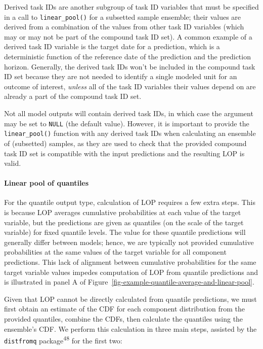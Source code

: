 \documentclass[
]{article}
\let\oldparagraph\paragraph
\renewcommand{\paragraph}[1]{\oldparagraph{#1}\mbox{}}
\begin{document}
Derived task IDs are another subgroup of task ID variables that must be
specified in a call to \texttt{linear\_pool()} for a subsetted sample
ensemble; their values are derived from a combination of the values from
other task ID variables (which may or may not be part of the compound
task ID set). A common example of a derived task ID variable is the
target date for a prediction, which is a deterministic function of the
reference date of the prediction and the prediction horizon. Generally,
the derived task IDs won't be included in the compound task ID set
because they are not needed to identify a single modeled unit for an
outcome of interest, \emph{unless} all of the task ID variables their
values depend on are already a part of the compound task ID set.

Not all model outputs will contain derived task IDs, in which case the
argument may be set to \texttt{NULL} (the default value). However, it is
important to provide the \texttt{linear\_pool()} function with any
derived task IDs when calculating an ensemble of (subsetted) samples, as
they are used to check that the provided compound task ID set is
compatible with the input predictions and the resulting LOP is valid.

\paragraph{Linear pool of quantiles}\label{linear-pool-of-quantiles}

For the quantile output type, calculation of LOP requires a few extra
steps. This is because LOP averages cumulative probabilities at each
value of the target variable, but the predictions are given as quantiles
(on the scale of the target variable) for fixed quantile levels. The
value for these quantile predictions will generally differ between
models; hence, we are typically not provided cumulative probabilities at
the same values of the target variable for all component predictions.
This lack of alignment between cumulative probabilities for the same
target variable values impedes computation of LOP from quantile
predictions and is illustrated in panel A of
Figure~\ref{fig-example-quantile-average-and-linear-pool}.

Given that LOP cannot be directly calculated from quantile predictions,
we must first obtain an estimate of the CDF for each component
distribution from the provided quantiles, combine the CDFs, then
calculate the quantiles using the ensemble's CDF. We perform this
calculation in three main steps, assisted by the \texttt{distfromq}
package\textsuperscript{48} for the first two:
\end{document}
